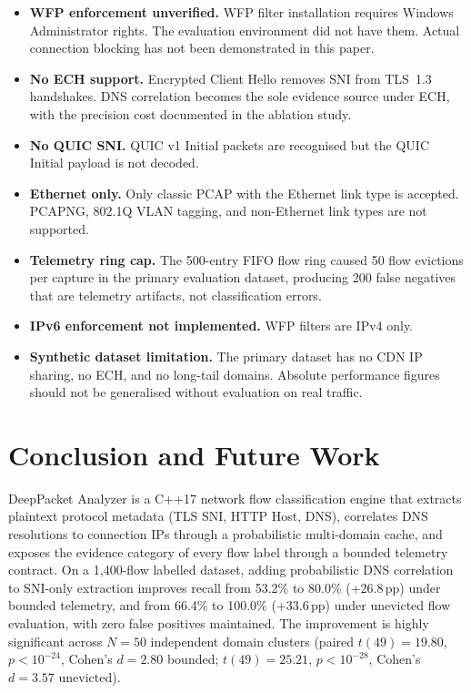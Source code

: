 \documentclass[conference]{IEEEtran}
\begin{document}
\begin{itemize}
\item \textbf{WFP enforcement unverified.}
WFP filter installation requires Windows Administrator rights.
The evaluation environment did not have them.
Actual connection blocking has not been demonstrated in this paper.
\item \textbf{No ECH support.}
Encrypted Client Hello removes SNI from TLS~1.3 handshakes.
DNS correlation becomes the sole evidence source under ECH,
with the precision cost documented in the ablation study.
\item \textbf{No QUIC SNI.}
QUIC v1 Initial packets are recognised but the QUIC Initial payload
is not decoded.
\item \textbf{Ethernet only.}
Only classic PCAP with the Ethernet link type is accepted.
PCAPNG, 802.1Q VLAN tagging, and non-Ethernet link types are
not supported.
\item \textbf{Telemetry ring cap.}
The 500-entry FIFO flow ring caused 50 flow evictions per capture
in the primary evaluation dataset, producing 200 false negatives
that are telemetry artifacts, not classification errors.
\item \textbf{IPv6 enforcement not implemented.}
WFP filters are IPv4 only.
\item \textbf{Synthetic dataset limitation.}
The primary dataset has no CDN IP sharing, no ECH, and no
long-tail domains.
Absolute performance figures should not be generalised
without evaluation on real traffic.
\end{itemize}

\section{Conclusion and Future Work}

DeepPacket Analyzer is a C++17 network flow classification engine
that extracts plaintext protocol metadata (TLS SNI, HTTP Host, DNS),
correlates DNS resolutions to connection IPs through a probabilistic
multi-domain cache, and exposes the evidence category of every flow
label through a bounded telemetry contract.
On a 1,400-flow labelled dataset, adding probabilistic DNS correlation
to SNI-only extraction improves recall from 53.2\% to 80.0\%
(+26.8\,pp) under bounded telemetry, and from 66.4\% to 100.0\%
(+33.6\,pp) under unevicted flow evaluation, with zero false positives maintained.
The improvement is highly significant across $N=50$ independent domain
clusters (paired $t(49)=19.80$, $p<10^{-24}$, Cohen's $d=2.80$ bounded;
$t(49)=25.21$, $p<10^{-28}$, Cohen's $d=3.57$ unevicted).
\end{document}
